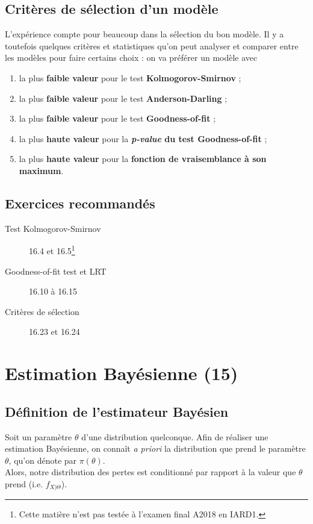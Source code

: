 \documentclass[12pt, french]{report}
\begin{document}
\section{Critères de sélection d'un modèle}
L'expérience compte pour beaucoup dans la sélection du bon modèle. Il y a toutefois quelques critères et statistiques qu'on peut analyser et comparer entre les modèles pour faire certains choix : on va préférer un modèle avec
\begin{enumerate}
\item la plus \textbf{faible valeur} pour le test \textbf{Kolmogorov-Smirnov} ; 
\item  la plus \textbf{faible valeur} pour le test \textbf{Anderson-Darling} ;
\item  la plus \textbf{faible valeur} pour le test \textbf{Goodness-of-fit} ;
\item la plus \textbf{haute valeur} pour la \textbf{\emph{p-value} du test Goodness-of-fit} ; 
\item la plus \textbf{haute valeur} pour la \textbf{fonction de vraisemblance à son maximum}.
\end{enumerate}




\section{Exercices recommandés}
\begin{description}
\item[Test Kolmogorov-Smirnov] 16.4 et 16.5\footnote{Cette matière n'est pas testée à l'examen final A2018 en IARD1.}
\item[Goodness-of-fit test et LRT] 16.10 à 16.15
\item[Critères de sélection] 16.23 et 16.24
\end{description}








\chapter{Estimation Bayésienne (15)}
\section{Définition de l'estimateur Bayésien}
\begin{definition}
Soit un paramètre $\theta$ d'une distribution quelconque. Afin de réaliser une estimation Bayésienne, on connaît \emph{a priori} la distribution que prend le paramètre $\theta$, qu'on dénote par $\pi(\theta)$. \\

Alors, notre distribution des pertes est conditionné par rapport à la valeur que $\theta$ prend (i.e. $f_{X|\Theta}$).
\end{definition}
\end{document}
